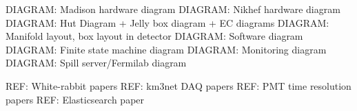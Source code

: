 DIAGRAM: Madison hardware diagram
DIAGRAM: Nikhef hardware diagram
DIAGRAM: Hut Diagram + Jelly box diagram + EC diagrams
DIAGRAM: Manifold layout, box layout in detector
DIAGRAM: Software diagram
DIAGRAM: Finite state machine diagram
DIAGRAM: Monitoring diagram
DIAGRAM: Spill server/Fermilab diagram

REF: White-rabbit papers
REF: km3net DAQ papers
REF: PMT time resolution papers
REF: Elasticsearch paper